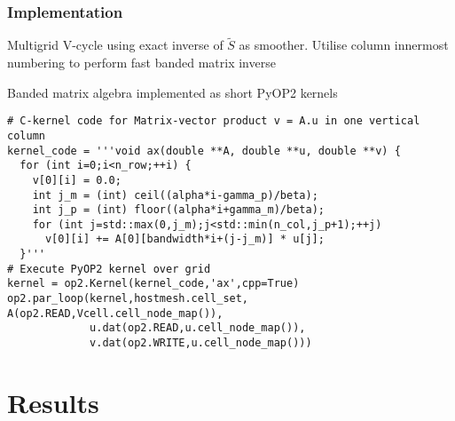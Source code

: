 \documentclass[presentation]{beamer}
\begin{document}
\begin{frame}
  \frametitle{Implementation}
  Multigrid V-cycle using exact inverse of $\tilde{S}$ as smoother.
  Utilise column innermost numbering to perform fast banded matrix
  inverse
  \begin{center}
  \end{center}

\framebreak

Banded matrix algebra implemented as short PyOP2 kernels

\begin{verbatim}
# C-kernel code for Matrix-vector product v = A.u in one vertical column
kernel_code = '''void ax(double **A, double **u, double **v) {
  for (int i=0;i<n_row;++i) {                                   
    v[0][i] = 0.0;                                                     
    int j_m = (int) ceil((alpha*i-gamma_p)/beta);   
    int j_p = (int) floor((alpha*i+gamma_m)/beta);  
    for (int j=std::max(0,j_m);j<std::min(n_col,j_p+1);++j)
      v[0][i] += A[0][bandwidth*i+(j-j_m)] * u[j];
  }'''
# Execute PyOP2 kernel over grid
kernel = op2.Kernel(kernel_code,'ax',cpp=True)
op2.par_loop(kernel,hostmesh.cell_set, A(op2.READ,Vcell.cell_node_map()),
             u.dat(op2.READ,u.cell_node_map()),
             v.dat(op2.WRITE,u.cell_node_map()))
\end{verbatim}
\end{frame}
\section{Results}
\end{document}
